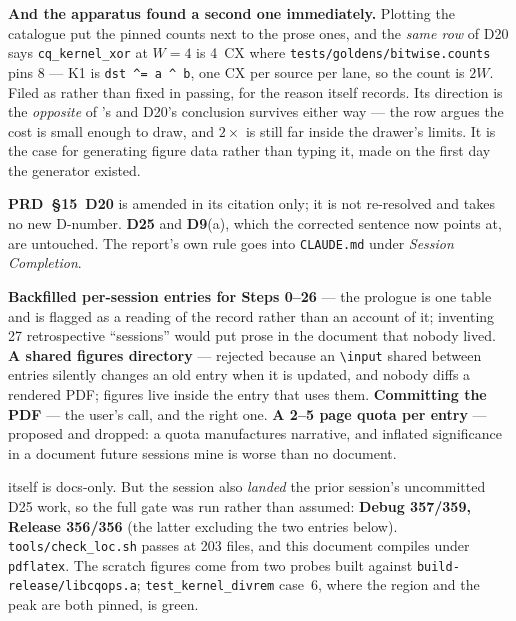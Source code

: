 \noindent\textbf{And the apparatus found a second one immediately.} Plotting the
catalogue put the pinned counts next to the prose ones, and the \emph{same row}
of D20 says \texttt{cq\_kernel\_xor} at $W=4$ is 4~CX where
\texttt{tests/goldens/bitwise.counts} pins 8 --- K1 is
\texttt{dst\,\^{}=\,a\,\^{}\,b}, one CX per source per lane, so the count is
$2W$. Filed as  rather than fixed in passing, for the reason
 itself records. Its direction is the \emph{opposite} of
's and D20's conclusion survives either way --- the row argues the cost
is small enough to draw, and $2\times$ is still far inside the drawer's limits.
It is the case for generating figure data rather than typing it, made on the
first day the generator existed.

\textbf{PRD~§15~D20} is amended in its citation only; it is not re-resolved and
takes no new D-number. \textbf{D25} and \textbf{D9}(a), which the corrected
sentence now points at, are untouched. The report's own rule goes into
\texttt{CLAUDE.md} under \emph{Session Completion}.

\textbf{Backfilled per-session entries for Steps 0--26} --- the prologue is one
table and is flagged as a reading of the record rather than an account of it;
inventing 27 retrospective ``sessions'' would put prose in the document that
nobody lived. \textbf{A shared figures directory} --- rejected because an
\texttt{\textbackslash input} shared between entries silently changes an old
entry when it is updated, and nobody diffs a rendered PDF; figures live inside
the entry that uses them. \textbf{Committing the PDF} --- the user's call, and
the right one. \textbf{A 2--5 page quota per entry} --- proposed and dropped: a
quota manufactures narrative, and inflated significance in a document future
sessions mine is worse than no document.

 itself is docs-only. But the session also \emph{landed} the prior
session's uncommitted D25 work, so the full gate was run rather than assumed:
\textbf{Debug 357/359, Release 356/356} (the latter excluding the two entries
below). \texttt{tools/check\_loc.sh} passes at 203 files, and this document
compiles under \texttt{pdflatex}. The scratch figures come from two probes built
against \texttt{build-release/libcqops.a}; \texttt{test\_kernel\_divrem} case~6,
where the region and the peak are both pinned, is green.

